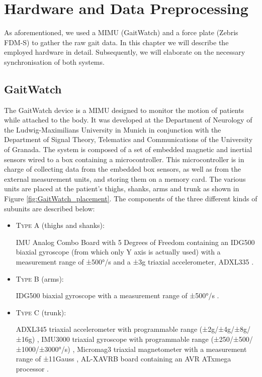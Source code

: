 \chapter{Hardware and Data Preprocessing}
\label{ch:Hardware}

As aforementioned, we used a MIMU (GaitWatch) and a force plate (Zebris FDM-S) to gather the raw gait data. In this chapter we will describe the employed hardware in detail. Subsequently, we will elaborate on the necessary synchronisation of both systems.

\section{GaitWatch}

The GaitWatch device \cite{olivares_vicente_gaitwatch_2013} is a MIMU designed to monitor the motion of patients while attached to the body. It was developed at the Department of Neurology of the Ludwig-Maximilians University in Munich in conjunction with the Department of Signal Theory, Telematics and Communications of the University of Granada. The system is composed of a set of embedded magnetic and inertial sensors wired to a box containing a microcontroller. This microcontroller is in charge of collecting data from the embedded box sensors, as well as from the external measurement units, and storing them on a memory card. The various units are placed at the patient's thighs, shanks, arms and trunk as shown in Figure \ref{fig:GaitWatch_placement}. The components of the three different kinds of subunits are described below:



\begin{itemize}

\item \textsc{Type A} (thighs and shanks): 

IMU Analog Combo Board with 5 Degrees of Freedom \cite{IMU5} containing an IDG500 biaxial gyroscope (from which only Y axis is actually used) with a measurement range of ±500°/s \cite{IDG500} and a ±3g triaxial accelerometer, ADXL335 \cite{ADXL335}.

\item \textsc{Type B} (arms):

IDG500 biaxial gyroscope with a measurement range of ±500°/s \cite{IDG500}.

\item \textsc{Type C} (trunk):

ADXL345 triaxial accelerometer with programmable range (±2g/±4g/±8g/±16g) \cite{ADXL345},
IMU3000 triaxial gyroscope with programmable range (±250/±500/±1000/±3000°/s) \cite{IMU3000}, 
Micromag3 triaxial magnetometer with a measurement range of ±11Gauss \cite{MicroMag3}, AL-XAVRB board containing an AVR ATxmega processor \cite{AVRATxmega}.

\end{itemize}


